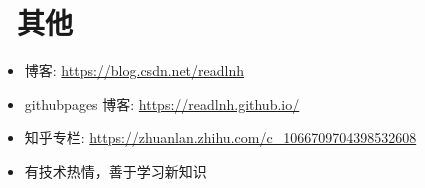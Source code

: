 \documentclass{resume}
\begin{document}

\section{\faInfo\ 其他}
\begin{itemize}[parsep=0.25ex]
  \item 博客: \url{https://blog.csdn.net/readlnh}
  \item githubpages 博客: \url{https://readlnh.github.io/}
  \item 知乎专栏: \url{https://zhuanlan.zhihu.com/c_1066709704398532608}
  \item 有技术热情，善于学习新知识
\end{itemize}

%
%
\end{document}
